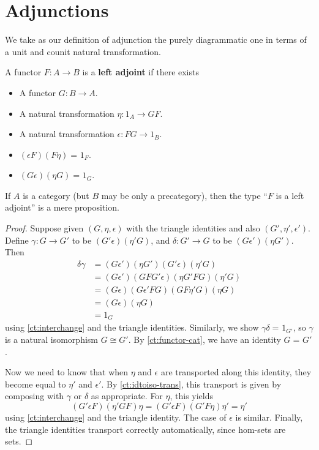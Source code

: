\documentclass{mscs}
\newcommand{\id}[3][]{\ensuremath{#2 =_{#1} #3}\xspace}
\numberwithin{equation}{section}
\begin{document}
\section{Adjunctions}
\label{sec:adjunctions}

We take as our definition of adjunction the purely diagrammatic one in terms of a unit and counit natural transformation.

\begin{defn}\label{def:adjoint}
  A functor $F:A\to B$ is a \textbf{left adjoint} if there exists
  \begin{itemize}
  \item A functor $G:B\to A$.
  \item A natural transformation $\eta:1_A \to GF$.
  \item A natural transformation $\epsilon:FG\to 1_B$.
  \item $\id{(\epsilon F)(F\eta)}{1_F}$.
  \item $\id{(G\epsilon)(\eta G)}{1_G}$.
  \end{itemize}
\end{defn}

\begin{lem}\label{ct:adjprop}
  If $A$ is a category (but $B$ may be only a precategory), then the type ``$F$ is a left adjoint'' is a mere proposition.
\end{lem}
\begin{proof}
  Suppose given $(G,\eta,\epsilon)$ with the triangle identities and also $(G',\eta',\epsilon')$.
  Define $\gamma:G\to G'$ to be $(G'\epsilon)(\eta' G)$, and $\delta:G'\to G$ to be $(G\epsilon')(\eta G')$.
  Then
  \begin{align*}
    \delta\gamma &=
    (G\epsilon')(\eta G')(G'\epsilon)(\eta'G)\\
    &= (G\epsilon')(G F G'\epsilon)(\eta G' F G)(\eta'G)\\
    &= (G\epsilon)(G\epsilon'FG)(G F \eta' G)(\eta G)\\
    &= (G\epsilon)(\eta G)\\
    &= 1_G
  \end{align*}
  using \autoref{ct:interchange} and the triangle identities.
  Similarly, we show $\id{\gamma\delta}{1_{G'}}$, so $\gamma$ is a natural isomorphism $G\cong G'$.
  By \autoref{ct:functor-cat}, we have an identity $\id G {G'}$.

  Now we need to know that when $\eta$ and $\epsilon$ are transported along this identity, they become equal to $\eta'$ and $\epsilon'$.
  By \autoref{ct:idtoiso-trans}, this transport is given by composing with $\gamma$ or $\delta$ as appropriate.
  For $\eta$, this yields
  \begin{equation*}
    (G'\epsilon F)(\eta'GF)\eta
    = (G'\epsilon F)(G'F\eta)\eta'
    = \eta'
  \end{equation*}
  using \autoref{ct:interchange} and the triangle identity.
  The case of $\epsilon$ is similar.
  Finally, the triangle identities transport correctly automatically, since hom-sets are sets.
\end{proof}
\end{document}
